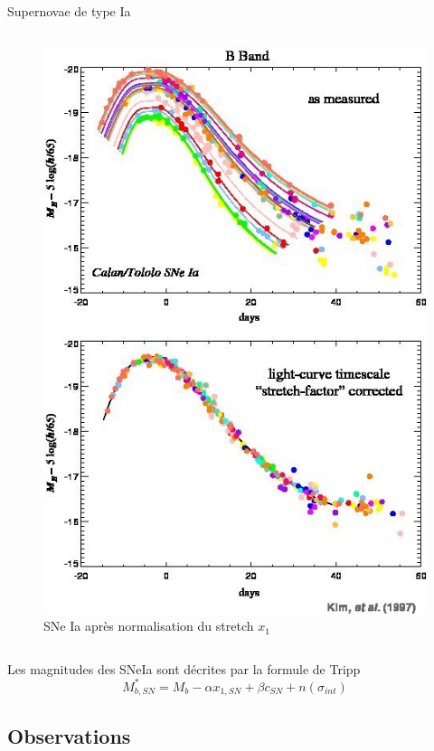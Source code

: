 \documentclass{beamer}
\begin{document}
\begin{frame}{Supernovae de type Ia}
\begin{columns}
\begin{column}{.5\textwidth}
\begin{figure}
		\includegraphics[width=.8\textwidth, trim={0 0 0 12.5cm}, clip]{figures/SNe-Ia-stretch.jpg}
		\caption{SNe Ia après normalisation du stretch $x_1$}
	\end{figure}
\end{column}
\end{columns}
Les magnitudes des SNeIa sont décrites par la formule de Tripp
\begin{equation}
	M^*_{b,SN} = M_b - \alpha x_{1,SN} + \beta c_{SN} + n(\sigma_{int})
\end{equation}
\end{frame}

\subsection{Observations}

\end{document}
